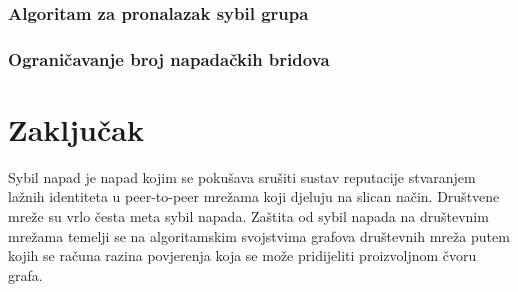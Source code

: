 \documentclass[times, utf8, seminar, numeric]{fer}
\begin{document}
\subsection{Algoritam za pronalazak sybil grupa}

\subsection{Ograničavanje broj napadačkih bridova}

\chapter{Zaključak}




\begin{sazetak}
  Sybil napad je napad kojim se pokušava srušiti sustav reputacije stvaranjem lažnih identiteta u peer-to-peer mrežama koji djeluju na slican način. Društvene mreže su vrlo česta meta sybil napada. Zaštita od sybil napada na društevnim mrežama temelji se na algoritamskim svojstvima grafova društevnih mreža putem kojih se računa razina povjerenja koja se može pridijeliti proizvoljnom čvoru grafa.

\end{sazetak}
\end{document}
